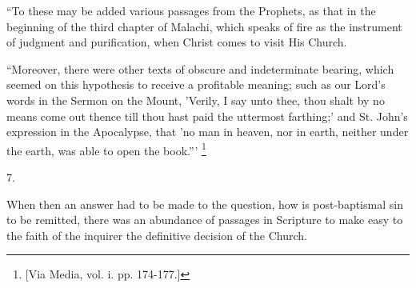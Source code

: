 ``To these may be added various passages from the Prophets, as
that in the beginning of the third chapter of Malachi, which speaks of
fire as the instrument of judgment and purification, when Christ comes
to visit His Church.

``Moreover, there were other texts of obscure and indeterminate
bearing, which seemed on this hypothesis to receive a profitable
meaning; such as our Lord's words in the Sermon on the Mount, 'Verily,
I say unto thee, thou shalt by no means come out thence till thou hast
paid the uttermost farthing;' and St. John's expression in the
Apocalypse, that 'no man in heaven, nor in earth, neither under the
earth, was able to open the book.''' \footnote{[Via Media, vol. i. pp. 174-177.]}

7.

When then an answer had to be made to the question, how is
post-baptismal sin to be remitted, there was an abundance of passages
in Scripture to make easy to the faith of the inquirer the definitive
decision of the Church.


